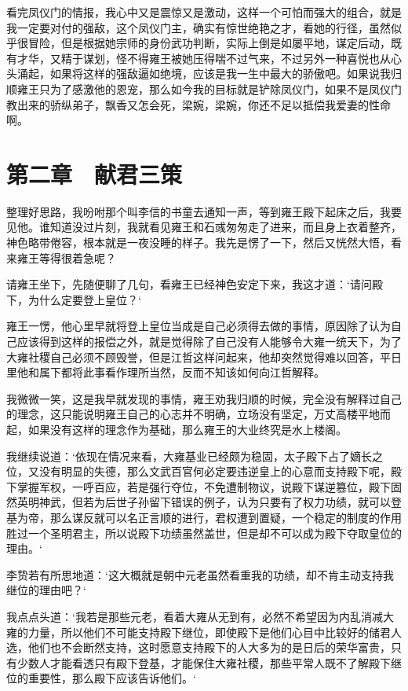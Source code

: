 看完凤仪门的情报，我心中又是震惊又是激动，这样一个可怕而强大的组合，就是我一定要对付的强敌，这个凤仪门主，确实有惊世绝艳之才，看她的行径，虽然似乎很冒险，但是根据她宗师的身份武功判断，实际上倒是如屡平地，谋定后动，既有才华，又精于谋划，怪不得雍王被她压得喘不过气来，不过另外一种喜悦也从心头涌起，如果将这样的强敌逼如绝境，应该是我一生中最大的骄傲吧。如果说我归顺雍王只为了感激他的恩宠，那么如今我的目标就是铲除凤仪门，如果不是凤仪门教出来的骄纵弟子，飘香又怎会死，梁婉，梁婉，你还不足以抵偿我爱妻的性命啊。

\chapter{第二章　献君三策}

整理好思路，我吩咐那个叫李信的书童去通知一声，等到雍王殿下起床之后，我要见他。谁知道没过片刻，我就看见雍王和石彧匆匆走了进来，而且身上衣着整齐，神色略带倦容，根本就是一夜没睡的样子。我先是愣了一下，然后又恍然大悟，看来雍王等得很着急呢？

请雍王坐下，先随便聊了几句，看雍王已经神色安定下来，我这才道：‘请问殿下，为什么定要登上皇位？‘

雍王一愣，他心里早就将登上皇位当成是自己必须得去做的事情，原因除了认为自己应该得到这样的报偿之外，就是觉得除了自己没有人能够令大雍一统天下，为了大雍社稷自己必须不顾毁誉，但是江哲这样问起来，他却突然觉得难以回答，平日里他和属下都将此事看作理所当然，反而不知该如何向江哲解释。

我微微一笑，这是我早就发现的事情，雍王劝我归顺的时候，完全没有解释过自己的理念，这只能说明雍王自己的心志并不明确，立场没有坚定，万丈高楼平地而起，如果没有这样的理念作为基础，那么雍王的大业终究是水上楼阁。

我继续说道：‘依现在情况来看，大雍基业已经颇为稳固，太子殿下占了嫡长之位，又没有明显的失德，那么文武百官何必定要违逆皇上的心意而支持殿下呢，殿下掌握军权，一呼百应，若是强行夺位，不免遭制物议，说殿下谋逆篡位，殿下固然英明神武，但若为后世子孙留下错误的例子，认为只要有了权力功绩，就可以登基为帝，那么谋反就可以名正言顺的进行，君权遭到置疑，一个稳定的制度的作用胜过一个圣明君主，所以说殿下功绩虽然盖世，但是却不可以成为殿下夺取皇位的理由。‘

李贽若有所思地道：‘这大概就是朝中元老虽然看重我的功绩，却不肯主动支持我继位的理由吧？‘

我点点头道：‘我若是那些元老，看着大雍从无到有，必然不希望因为内乱消减大雍的力量，所以他们不可能支持殿下继位，即使殿下是他们心目中比较好的储君人选，他们也不会断然支持，这时愿意支持殿下的人大多为的是日后的荣华富贵，只有少数人才能看透只有殿下登基，才能保住大雍社稷，那些平常人既不了解殿下继位的重要性，那么殿下应该告诉他们。‘

